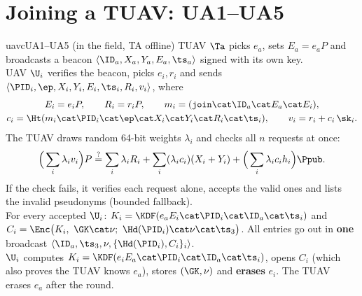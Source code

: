 \section{Joining a TUAV: UA1--UA5}
\begin{stepbox}{uavc}{UA1--UA5 \;(in the field, TA offline)}
 TUAV $\Ta$ picks $e_a$, sets $E_a=e_aP$ and broadcasts a beacon $\langle\ID_a,X_a,Y_a,E_a,\ts_a\rangle$ signed with its own key.\\
 UAV $\U_i$ verifies the beacon, picks $e_i,r_i$ and sends $\langle\PID_i,\ep,X_i,Y_i,E_i,\ts_i,R_i,v_i\rangle$, where
\begin{gather*}
E_i=e_iP,\qquad R_i=r_iP,\qquad m_i=(\texttt{join}\cat\ID_a\cat E_a\cat E_i),\\
c_i=\Ht(m_i\cat\PID_i\cat\ep\cat X_i\cat Y_i\cat R_i\cat\ts_i),\qquad v_i=r_i+c_i\,\sk_i .
\end{gather*}
 The TUAV draws random 64-bit weights $\lambda_i$ and checks all $n$ requests at once:
\begin{equation}\label{eq:bv}
\Big(\sum_{i}\lambda_iv_i\Big)P\overset{?}{=}\sum_i\lambda_iR_i+\sum_i(\lambda_ic_i)(X_i+Y_i)+\Big(\sum_i\lambda_ic_ih_i\Big)\Ppub .
\end{equation}
If the check fails, it verifies each request alone, accepts the valid ones and lists the invalid pseudonyms (bounded fallback).\\
 For every accepted $\U_i$: \;$K_i=\KDF(e_aE_i\cat\PID_i\cat\ID_a\cat\ts_i)$ and
$C_i=\Enc\big(K_i,\ \GK\cat\nu;\ \Hd(\PID_i)\cat\nu\cat\ts_3\big)$. All entries go out in \textbf{one} broadcast $\langle\ID_a,\ts_3,\nu,\{\Hd(\PID_i),C_i\}_i\rangle$.\\
 $\U_i$ computes $K_i=\KDF(e_iE_a\cat\PID_i\cat\ID_a\cat\ts_i)$, opens $C_i$ (which also proves the TUAV knows $e_a$), stores
$(\GK,\nu)$ and \textbf{erases} $e_i$. The TUAV erases $e_a$ after the round.
\end{stepbox}

